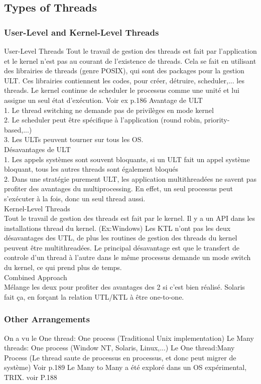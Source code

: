 \subsection{Types of Threads}
\subsubsection{User-Level and Kernel-Level Threads}
User-Level Threads
Tout le travail de gestion des threads est fait par l’application et le kernel n’est pas au courant de l’existence de threads. Cela se fait en utilisant des librairies de threads (genre POSIX), qui sont des packages pour la gestion ULT. Ces librairies contiennent les codes, pour créer, détruire, scheduler,... les threads. Le kernel continue de scheduler le processus comme une unité et lui assigne un seul état d’exécution. Voir ex p.186 Avantage de ULT \\
1. Le thread switching ne demande pas de privilèges en mode kernel \\
2. Le scheduler peut être spécifique à l’application (round robin, priority-based,...) \\
3. Les ULTs peuvent tourner sur tous les OS. \\
Désavantages de ULT \\
1. Les appels systèmes sont souvent bloquants, si un ULT fait un appel système bloquant, tous les autres threads sont également bloqués \\
2. Dans une stratégie purement ULT, les application multithreadées ne savent pas profiter des avantages du multiprocessing. En effet, un seul processus peut s’exécuter à la fois, donc un seul thread aussi. \\
Kernel-Level Threads \\
Tout le travail de gestion des threads est fait par le kernel. Il y a un API dans les installations thread du kernel. (Ex:Windows)
Les KTL n’ont pas les deux désavantages des UTL, de plus les routines de gestion des threads du kernel peuvent être multithreadées. Le principal désavantage est que le transfert de controle d’un thread à l’autre dans le même processus demande un mode switch du kernel, ce qui prend plus de temps.\\
Combined Approach \\
Mélange les deux pour profiter des avantages des 2 si c’est bien réalisé. Solaris fait ça, en forçant la relation UTL/KTL à être one-to-one.
\subsubsection{Other Arrangements}
On a vu le One thread: One process (Traditional Unix implementation)
Le Many threads: One process (Window NT, Solaris, Linux,...)
Le One thread:Many Process (Le thread saute de processus en processus, et donc peut migrer de système) Voir p.189 Le Many to Many a été exploré dans un OS expérimental, TRIX. voir P.188
